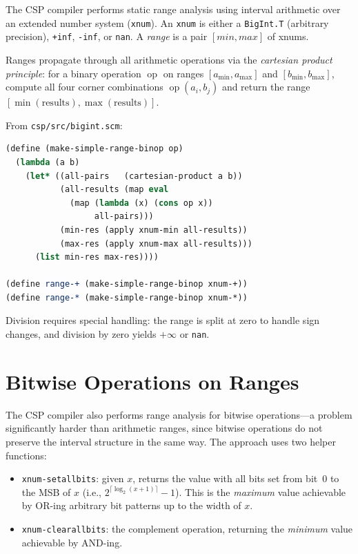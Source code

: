 \documentclass[12pt]{report}
\begin{document}
The CSP compiler performs static range analysis using interval
arithmetic over an extended number system ({\tt xnum}).  An
{\tt xnum} is either a {\tt BigInt.T} (arbitrary precision),
{\tt +inf}, {\tt -inf}, or {\tt nan}.  A \emph{range} is a pair
$[\mathit{min}, \mathit{max}]$ of xnums.

Ranges propagate through all arithmetic operations via the
\emph{cartesian product principle}: for a binary operation
$\mathop{op}$ on ranges $[a_{\min}, a_{\max}]$ and
$[b_{\min}, b_{\max}]$, compute all four corner combinations
$\mathop{op}(a_i, b_j)$ and return the range
$[\min(\text{results}), \max(\text{results})]$.

From {\tt csp/src/bigint.scm}:

\begin{lstlisting}[language=Scheme]
(define (make-simple-range-binop op)
  (lambda (a b)
    (let* ((all-pairs   (cartesian-product a b))
           (all-results (map eval
             (map (lambda (x) (cons op x))
                  all-pairs)))
           (min-res (apply xnum-min all-results))
           (max-res (apply xnum-max all-results)))
      (list min-res max-res))))

(define range-+ (make-simple-range-binop xnum-+))
(define range-* (make-simple-range-binop xnum-*))
\end{lstlisting}

\noindent Division requires special handling: the range is split at
zero to handle sign changes, and division by zero yields
$+\infty$ or {\tt nan}.

\section{Bitwise Operations on Ranges}

The CSP compiler also performs range analysis for bitwise
operations---a problem significantly harder than arithmetic ranges,
since bitwise operations do not preserve the interval structure in
the same way.  The approach uses two helper functions:

\begin{itemize}
\item {\tt xnum-setallbits}: given $x$, returns the value with all
  bits set from bit~0 to the MSB of $x$ (i.e., $2^{\lceil\log_2(x+1)\rceil}-1$).
  This is the \emph{maximum} value achievable by OR-ing arbitrary
  bit patterns up to the width of $x$.

\item {\tt xnum-clearallbits}: the complement operation, returning
  the \emph{minimum} value achievable by AND-ing.
\end{itemize}
\end{document}
